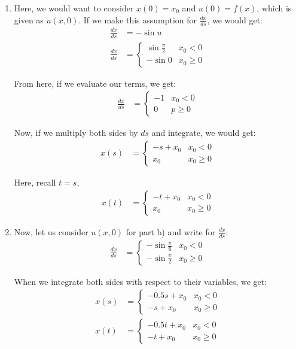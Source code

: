 \begin{enumerate}
    \item
  Here, we would want to consider $x(0) = x_0$ and $u(0) = f(x)$, which is given as $u(x, 0)$. If we make this assumption for $\frac{dx}{ds}$, we would get:
  \begin{align}
    \frac{dx}{ds}
    & = - \sin u\\
    \frac{dx}{ds}
    & =
    \begin{cases}
      \sin \frac{\pi}{2} & x_0 < 0\\
      - \sin 0 & x_0 \geq 0
    \end{cases}
  \end{align}

  From here, if we evaluate our terms, we get:
  \begin{align}
    \frac{dx}{ds} & =
    \begin{cases}
      -1 & x_0 < 0\\
      0 & p \geq 0
    \end{cases}
  \end{align}

  Now, if we multiply both sides by $ds$ and integrate, we would get:
  \begin{align}
    x(s) & =
    \begin{cases}
      -s + x_0 & x_0 < 0\\
      x_0 & x_0 \geq 0
    \end{cases}
  \end{align}

  Here, recall $t = s$,
  \begin{align}
    x(t) & =
    \begin{cases}
      -t + x_0 & x_0 < 0\\
      x_0 & x_0 \geq 0
    \end{cases}
  \end{align}

  \item
  Now, let us consider $u(x, 0)$ for part b) and write for $\frac{dx}{ds}$:
  \begin{align}
    \frac{dx}{ds} & =
    \begin{cases}
      - \sin \frac{\pi}{6} & x_0 < 0\\
      - \sin \frac{\pi}{2} & x_0 \geq 0
    \end{cases}
  \end{align}

  When we integrate both sides with respect to their variables, we get:
  \begin{align}
    x(s) & =
    \begin{cases}
      - 0.5 s + x_0 & x_0 < 0\\
      - s + x_0 & x_0 \geq 0
    \end{cases}\\
    x(t) & =
    \begin{cases}
      - 0.5 t + x_0 & x_0 < 0\\
      -     t + x_0 & x_0 \geq 0
    \end{cases}
  \end{align}

\end{enumerate}
